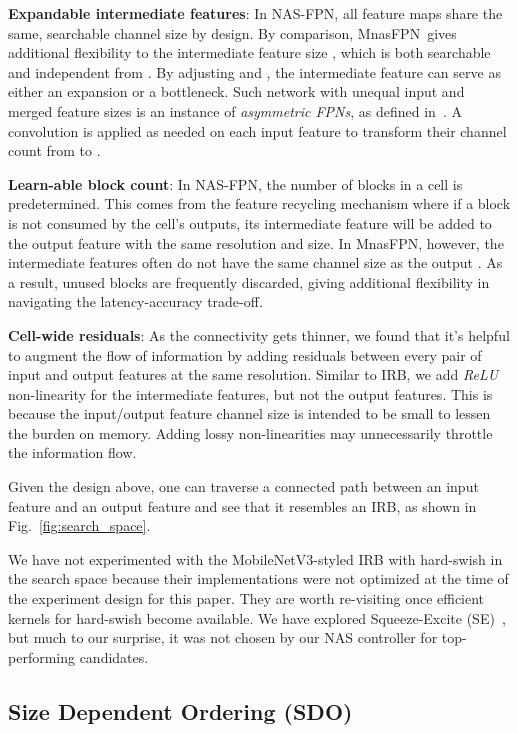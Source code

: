 \documentclass[10pt,twocolumn,letterpaper]{article}
\def\Mnasfpn{MnasFPN~}
\def\Mnasfpnnospace{MnasFPN}
\begin{document}
{\bf Expandable intermediate features}: In NAS-FPN, all feature maps share the same, searchable channel size  by design. By comparison, \Mnasfpn gives additional flexibility to the intermediate feature size , which is both searchable and independent from . By adjusting  and , the intermediate feature can serve as either an expansion or a bottleneck. Such network with unequal input and merged feature sizes is an instance of {\it asymmetric FPNs}, as defined in~\cite{kirillov2019panoptic}. A  convolution is applied as needed on each input feature to transform their channel count from  to . 

{\bf Learn-able block count}: In NAS-FPN, the number of blocks in a cell is predetermined. This comes from the feature recycling mechanism where if a block is not consumed by the cell's outputs, its intermediate feature will be added to the output feature with the same resolution and size. In \Mnasfpnnospace, however, the intermediate features often do not have the same channel size  as the output . As a result, unused blocks are frequently discarded, giving additional flexibility in navigating the latency-accuracy trade-off.  

{\bf Cell-wide residuals}: As the connectivity gets thinner, we found that it's helpful to augment the flow of information by adding residuals between every pair of input and output features at the same resolution. Similar to IRB, we add {\it ReLU} non-linearity for the intermediate features, but not the output features. This is because the input/output feature channel size  is intended to be small to lessen the burden on memory. Adding lossy non-linearities may unnecessarily throttle the information flow. 

Given the design above, one can traverse a connected path between an input feature and an output feature and see that it resembles an IRB, as shown in Fig.~\ref{fig:search_space}. 

We have not experimented with the MobileNetV3-styled IRB with hard-swish in the search space because their implementations were not optimized at the time of the experiment design for this paper. They are worth re-visiting once efficient kernels for hard-swish become available. We have explored Squeeze-Excite (SE)~\cite{hu2018squeeze}, but much to our surprise, it was not chosen by our NAS controller for top-performing candidates.

\subsection{Size Dependent Ordering (SDO)}
\label{sec:sdo}
\end{document}
